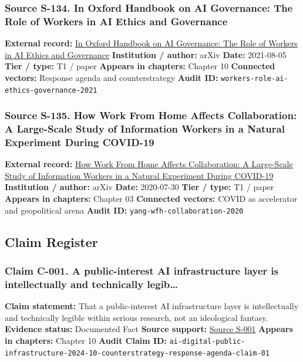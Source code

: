 \documentclass[
  american,
  11pt,
  letterpaper,
]{article}
\begin{document}
\subsubsection{Source S-134. In Oxford Handbook on AI Governance: The
Role of Workers in AI Ethics and
Governance}\label{source-s-134-in-oxford-handbook-on-ai-governance-the-role-of-workers-in-ai-ethics-and-governance}

\textbf{External record:} \href{https://arxiv.org/abs/2108.07700}{In
Oxford Handbook on AI Governance: The Role of Workers in AI Ethics and
Governance} \textbf{Institution / author:} arXiv \textbf{Date:}
2021-08-05 \textbf{Tier / type:} T1 / paper \textbf{Appears in
chapters:} Chapter 10 \textbf{Connected vectors:} Response agenda and
counterstrategy \textbf{Audit ID:}
\texttt{workers-role-ai-ethics-governance-2021}

\subsubsection{Source S-135. How Work From Home Affects Collaboration: A
Large-Scale Study of Information Workers in a Natural Experiment During
COVID-19}\label{source-s-135-how-work-from-home-affects-collaboration-a-large-scale-study-of-information-workers-in-a-natural-experiment-during-covid-19}

\textbf{External record:} \href{https://arxiv.org/abs/2007.15584}{How
Work From Home Affects Collaboration: A Large-Scale Study of Information
Workers in a Natural Experiment During COVID-19} \textbf{Institution /
author:} arXiv \textbf{Date:} 2020-07-30 \textbf{Tier / type:} T1 /
paper \textbf{Appears in chapters:} Chapter 03 \textbf{Connected
vectors:} COVID as accelerator and geopolitical arena \textbf{Audit ID:}
\texttt{yang-wfh-collaboration-2020}

\subsection{Claim Register}\label{claim-register}

\subsubsection{Claim C-001. A public-interest AI infrastructure layer is
intellectually and technically
legib\ldots{}}\label{claim-c-001-a-public-interest-ai-infrastructure-layer-is-intellectually-and-technically-legib}

\textbf{Claim statement:} That a public-interest AI infrastructure layer
is intellectually and technically legible within serious research, not
an ideological fantasy. \textbf{Evidence status:} Documented Fact
\textbf{Source support:}
\hyperref[source-s-001-interactions-between-artificial-intelligence-and-digital-public-infrastructure-concepts-benefits-and-challenges]{Source
S-001} \textbf{Appears in chapters:} Chapter 10 \textbf{Audit Claim ID:}
\texttt{ai-digital-public-infrastructure-2024-10-counterstrategy-response-agenda-claim-01}
\end{document}
